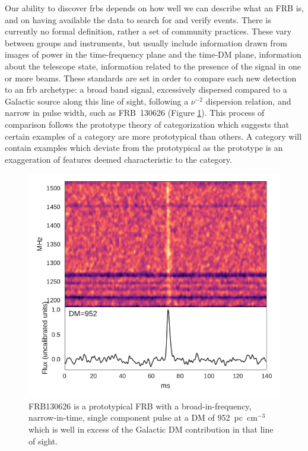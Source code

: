 \documentclass[a4paper,fleqn,usenatbib]{mnras}
\begin{document}
Our ability to discover \glspl{frb} depends on how well we can describe what an
FRB is, and on having available the data to search for and verify events. There
is currently no formal definition, rather a set of community practices. These
vary between groups and instruments, but usually include information drawn from
images of power in the time-frequency plane and the time-DM plane, information
about the telescope state, information related to the presence of the signal in
one or more beams.  These standards are set in order to compare each new
detection to an \gls{frb} archetype: a broad band signal, excessively dispersed
compared to a Galactic source along this line of sight, following a $\nu^{-2}$
dispersion relation, and narrow in pulse width, such as FRB~130626
\citep{2016MNRAS.460L..30C} (Figure \ref{fig:FRB130626}). This process of
comparison follows the prototype theory of categorization \citep{ROSCH1976382}
which suggests that certain examples of a category are more prototypical than
others. A category will contain examples which deviate from the prototypical as
the prototype is an exaggeration of features deemed characteristic to the
category.

\begin{figure}
    \includegraphics[width=1.0\linewidth]{figures/FRB130626.pdf}
    \caption{FRB130626 is a prototypical FRB with a broad-in-frequency,
    narrow-in-time, single component pulse at a DM of 952~pc~cm$^{-3}$ which is
    well in excess of the Galactic DM contribution in that line of sight.
    }
    \label{fig:FRB130626}
\end{figure}
\end{document}
